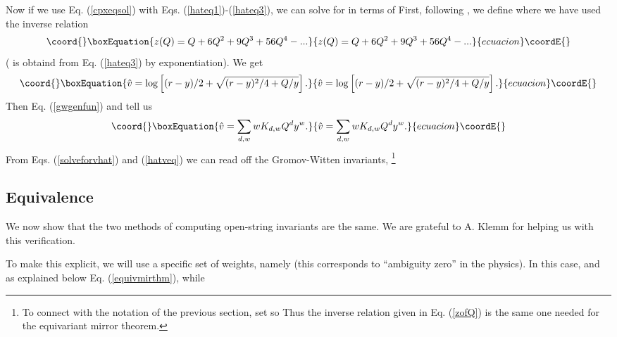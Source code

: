 \documentclass[a4paper,11pt]{article}
\begin{document}
Now if we use Eq. \!(\ref{cpxeqsol}) with
Eqs. (\ref{hateq1})-(\ref{hateq3}), we can
solve for \coordHE{} in terms of \coordHE{}
First, 
following \cite{AKV},
we define \coordHE{}
where we have used the inverse relation
\begin{equation}\coord{}\boxEquation{
\label{zofQ}
z(Q) = Q + 6Q^2 + 9Q^3 + 56Q^4 - ...
}{
z(Q) = Q + 6Q^2 + 9Q^3 + 56Q^4 - ...
}{ecuacion}\coordE{}\end{equation}
(\coordHE{} is obtaind from Eq. \!(\ref{hateq3}) by exponentiation). 
We get
\begin{equation}\coord{}\boxEquation{
\label{solveforvhat}
\hat{v} = \log\left[(r-y)/2 + \sqrt{(r-y)^2/4 + Q/y}\right].
}{
\hat{v} = \log\left[(r-y)/2 + \sqrt{(r-y)^2/4 + Q/y}\right].
}{ecuacion}\coordE{}\end{equation}
Then Eq. \!(\ref{gwgenfun})
and \coordHE{}
tell us
\begin{equation}\coord{}\boxEquation{
\label{hatveq}
\hat{v} = \sum_{d,w}w K_{d,w}Q^d y^w.
}{
\hat{v} = \sum_{d,w}w K_{d,w}Q^d y^w.
}{ecuacion}\coordE{}\end{equation}
From Eqs. (\ref{solveforvhat})
and (\ref{hatveq}) we can read off the Gromov-Witten
invariants, \coordHE{}\footnote{To
connect with the notation of the previous section,
set \coordHE{} so \coordHE{}  Thus the inverse relation
\coordHE{} given in Eq. \!(\ref{zofQ})
is the same one needed for the equivariant mirror theorem.}

\subsection{Equivalence}

We now show that the two methods of computing
open-string invariants are the same.  We are grateful
to A. Klemm for helping us with this verification.

To make this explicit, we will use a specific set
of weights, namely \coordHE{}  \coordHE{}
(this corresponds to ``ambiguity zero'' in the physics).
In this case, 
\coordHE{} and \coordHE{} as explained below
Eq. \!(\ref{equivmirthm}),
while \coordHE{}
\end{document}
